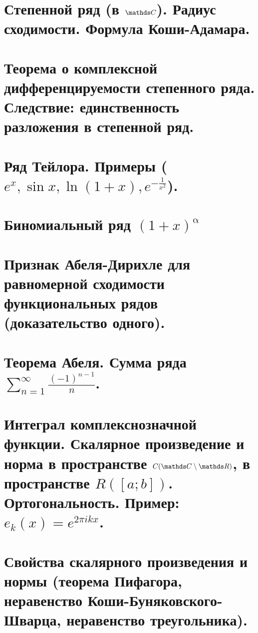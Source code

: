 \documentclass[11pt, fleqn]{article}
\begin{document}
\begin{Property}[3]
\begin{Property}[4]
\begin{Property}[2, аддитивность]
\begin{Proof}
\begin{Theorem}
		
\end{Theorem}

\newpage
\section{Степенной ряд (в $\CC$). Радиус сходимости. Формула Коши-Адамара.}


\newpage
\section{Теорема о комплексной дифференцируемости степенного ряда. Следствие: единственность разложения в степенной ряд.}


\newpage
\section{Ряд Тейлора. Примеры ($e^x,\sin x,\ln(1 + x), e^{-\frac{1}{x^2}}$).}


\newpage
\section{Биномиальный ряд $(1 + x)^\upalpha$}


\newpage
\section{Признак Абеля-Дирихле для равномерной сходимости функциональных рядов (доказательство одного).}


\newpage
\section{Теорема Абеля. Сумма ряда $\sum\limits_{n=1}^\infty \frac{(-1)^{n-1}}{n}$.}


\newpage
\section{Интеграл комплекснозначной функции. Скалярное произведение и норма в пространстве $C(\CC \setminus \R)$, в пространстве $R([a; b])$. Ортогональность. Пример: $e_k(x) = e^{2 \pi i k x}$.}


\newpage
\section{Свойства скалярного произведения и нормы (теорема Пифагора, неравенство Коши-Буняковского-Шварца, неравенство треугольника).}



\end{Proof}
\end{Property}
\end{Property}
\end{Property}
\end{document}
